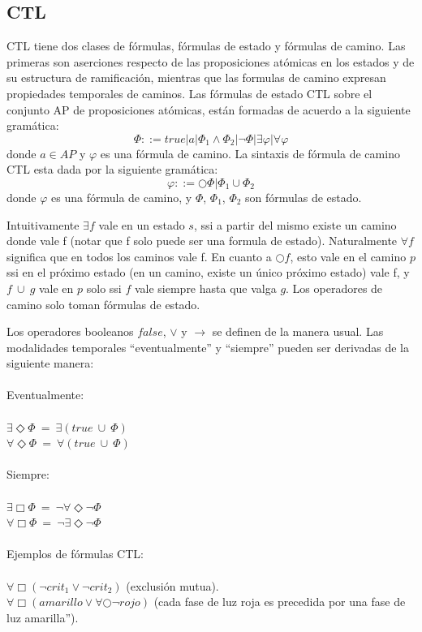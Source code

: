 \subsection{CTL}

\noindent CTL tiene dos clases de fórmulas, fórmulas de estado y fórmulas de camino. Las primeras son aserciones respecto de las proposiciones atómicas en los estados y de su estructura de ramificación, mientras que las formulas de camino expresan propiedades temporales de caminos.
Las fórmulas de estado CTL sobre el conjunto AP de proposiciones atómicas, están formadas de acuerdo a la siguiente gramática\cite{Baier:2}:
\[\Phi ::= true | a | \Phi_{1} \land \Phi_{2} | \neg \Phi | \exists \varphi | \forall \varphi  \]
donde $a \in AP$ y $\varphi$ es una fórmula de camino. La sintaxis de fórmula de camino CTL esta dada por la siguiente gramática:
\[\varphi ::= \bigcirc \Phi | \Phi_{1} \cup \Phi_{2} \]
donde $\varphi$ es una fórmula de camino, y $\Phi$, $\Phi_{1}$, $\Phi_{2}$ son fórmulas de estado.

\noindent Intuitivamente $\exists f$ vale en un estado $s$, ssi a partir del mismo existe un camino donde vale f (notar que f solo puede ser una formula de estado). Naturalmente $\forall f$ significa que en todos los caminos vale f. En cuanto a $\bigcirc f$, esto vale en el camino $p$ ssi en el próximo estado (en un camino, existe un único próximo estado) vale f, y $ f\  \cup \ g$ vale en $p$ solo ssi $f$ vale siempre hasta que valga $g$. Los operadores de camino solo toman fórmulas de estado.

\noindent Los operadores booleanos $false$, $\lor$ y $\to$ se definen de la manera usual. Las modalidades temporales “eventualmente” y “siempre” pueden ser derivadas de la siguiente manera:\\
\\
Eventualmente:\\
\\
$\exists \Diamond \Phi \ = \ \exists(true\ \cup \ \Phi)$\\
$\forall \Diamond \Phi \ = \ \forall(true\ \cup \ \Phi)$\\
\\
Siempre:\\
\\
$\exists \Box \Phi \ = \ \neg \forall \Diamond \neg \Phi$\\
$\forall \Box \Phi \ = \ \neg \exists \Diamond \neg \Phi$\\
\\
Ejemplos de fórmulas CTL:\\
\\
$\forall \Box (\neg crit_{1} \lor \neg crit_{2})$ (exclusión mutua).\\
$\forall \Box (amarillo \lor \forall \bigcirc \neg rojo)$ (cada fase de luz roja es precedida por una fase de luz amarilla”).

